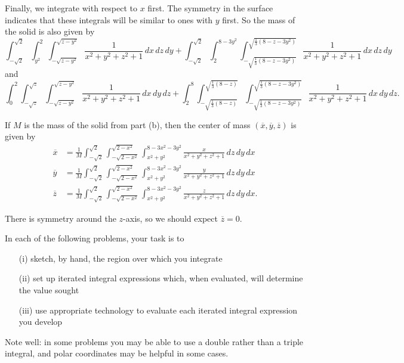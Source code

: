 \begin{exercises}
\begin{exerciseSolution}
Finally, we integrate with respect to $x$ first. The symmetry in the surface indicates that these integrals will be similar to ones with $y$ first. So the mass of the solid is also given by 
\[\int_{-\sqrt{2}}^{\sqrt{2}} \int_{y^2}^{2} \int_{-\sqrt{z-y^2}}^{\sqrt{z-y^2}} \frac{1}{x^2 + y^2 + z^2 + 1} \, dx \, dz \, dy + \int_{-\sqrt{2}}^{\sqrt{2}} \int_{2}^{8-3y^2} \int_{-\sqrt{\frac{1}{3}(8-z-3y^2)}}^{\sqrt{\frac{1}{3}(8-z-3y^2)}} \frac{1}{x^2 + y^2 + z^2 + 1} \, dx \, dz \, dy\]
and
\[\int_{0}^{2} \int_{-\sqrt{z}}^{\sqrt{z}} \int_{-\sqrt{z-y^2}}^{\sqrt{z-y^2}} \frac{1}{x^2 + y^2 + z^2 + 1} \, dx \, dy \, dz + \int_{2}^{8} \int_{-\sqrt{\frac{1}{3}(8-z)}}^{\sqrt{\frac{1}{3}(8-z)}} \int_{-\sqrt{\frac{1}{3}(8-z-3y^2)}}^{\sqrt{\frac{1}{3}(8-z-3y^2)}} \frac{1}{x^2 + y^2 + z^2 + 1} \, dx \, dy \, dz .\]

		\item If $M$ is the mass of the solid from part (b), then the center of mass $(\overline{x}, \overline{y}, \overline{z})$ is given by
\begin{align*}
\overline{x} &= \frac{1}{M} \int_{-\sqrt{2}}^{\sqrt{2}} \int_{-\sqrt{2-x^2}}^{\sqrt{2-x^2}} \int_{x^2+y^2}^{8-3x^2-3y^2} \frac{x}{x^2 + y^2 + z^2 + 1} \, dz \, dy \, dx  \\
\overline{y} &= \frac{1}{M} \int_{-\sqrt{2}}^{\sqrt{2}} \int_{-\sqrt{2-x^2}}^{\sqrt{2-x^2}} \int_{x^2+y^2}^{8-3x^2-3y^2} \frac{y}{x^2 + y^2 + z^2 + 1} \, dz \, dy \, dx \\
\overline{z} &= \frac{1}{M} \int_{-\sqrt{2}}^{\sqrt{2}} \int_{-\sqrt{2-x^2}}^{\sqrt{2-x^2}} \int_{x^2+y^2}^{8-3x^2-3y^2} \frac{z}{x^2 + y^2 + z^2 + 1} \, dz \, dy \, dx.
\end{align*}

		\item There is symmetry around the $z$-axis, so we should expect $\overline{z} = 0$. 
	\ea
\end{exerciseSolution}

\item In each of the following problems, your task is to 
	\begin{itemize}
	\item[(i)] sketch, by hand, the region over which you integrate
	\item[(ii)] set up iterated integral expressions which, when evaluated, will determine the value sought  
	\item[(iii)] use appropriate technology to evaluate each iterated integral expression you develop
	\end{itemize}
Note well:  in some problems you may be able to use a double rather than a triple integral, and polar coordinates may be helpful in some cases.	
\ba


\end{exercises}
